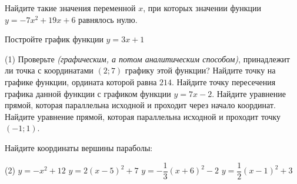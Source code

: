 \begin{homework}[number=1]
	\begin{listofex}
		\item Найдите такие значения переменной \( x \), при которых значении функции \( y=-7x^2+19x+6 \) равнялось нулю.
		\item Постройте график функции \( y=3x+1 \)
		\begin{tasks}(1)
			\task Проверьте \textit{(графическим, а потом аналитическим способом)}, принадлежит ли точка с координатами \( (2;7) \) графику этой функции?
			\task Найдите точку на графике функции, ордината которой равна \( 214 \).
			\task Найдите точку пересечения графика данной функции с графиком функции \( y=7x-2 \).
			\task Найдите уравнение прямой, которая параллельна исходной и проходит через начало координат.
			\task Найдите уравнение прямой, которая параллельна исходной и проходит точку \( (-1;1) \).
		\end{tasks}
		\item Найдите координаты вершины параболы:
		\begin{tasks}(2)
			\task \( y=-x^2+12 \)
			\task \( y=2(x-5)^2+7 \)
			\task \( y=-\dfrac{1}{3}(x+6)^2-2 \)
			\task \( y=\dfrac{1}{2}(x-1)^2+3 \)
		\end{tasks}
		\item {}
	\end{listofex}
\end{homework}

